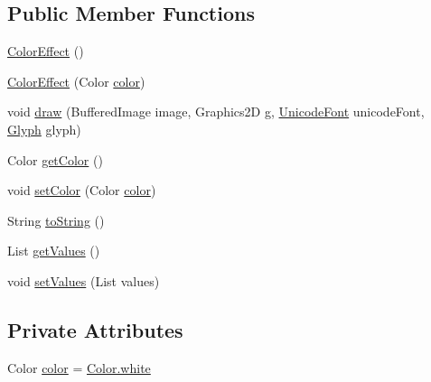 \subsection*{Public Member Functions}
\begin{DoxyCompactItemize}
\item 
\mbox{\hyperlink{classorg_1_1newdawn_1_1slick_1_1font_1_1effects_1_1_color_effect_aca7ac7b27182506a5877a5676a4bb404}{Color\+Effect}} ()
\item 
\mbox{\hyperlink{classorg_1_1newdawn_1_1slick_1_1font_1_1effects_1_1_color_effect_a85b6c7c78ee022dc42d6f82c4be32fe2}{Color\+Effect}} (Color \mbox{\hyperlink{classorg_1_1newdawn_1_1slick_1_1font_1_1effects_1_1_color_effect_a2eb4f77d200293ea86166edce12f9817}{color}})
\item 
void \mbox{\hyperlink{classorg_1_1newdawn_1_1slick_1_1font_1_1effects_1_1_color_effect_a79fa23028d343b2779d582aa0f03a0fe}{draw}} (Buffered\+Image image, Graphics2D g, \mbox{\hyperlink{classorg_1_1newdawn_1_1slick_1_1_unicode_font}{Unicode\+Font}} unicode\+Font, \mbox{\hyperlink{classorg_1_1newdawn_1_1slick_1_1font_1_1_glyph}{Glyph}} glyph)
\item 
Color \mbox{\hyperlink{classorg_1_1newdawn_1_1slick_1_1font_1_1effects_1_1_color_effect_a2fff83c42b7a56f45731353057cd18fa}{get\+Color}} ()
\item 
void \mbox{\hyperlink{classorg_1_1newdawn_1_1slick_1_1font_1_1effects_1_1_color_effect_a2ffbac9b174a71718bf7fe933dd1fd52}{set\+Color}} (Color \mbox{\hyperlink{classorg_1_1newdawn_1_1slick_1_1font_1_1effects_1_1_color_effect_a2eb4f77d200293ea86166edce12f9817}{color}})
\item 
String \mbox{\hyperlink{classorg_1_1newdawn_1_1slick_1_1font_1_1effects_1_1_color_effect_ad407a023e57bda66a9c20fdc66dd3224}{to\+String}} ()
\item 
List \mbox{\hyperlink{classorg_1_1newdawn_1_1slick_1_1font_1_1effects_1_1_color_effect_a295d74daac884b7e5dda1bbbd1263547}{get\+Values}} ()
\item 
void \mbox{\hyperlink{classorg_1_1newdawn_1_1slick_1_1font_1_1effects_1_1_color_effect_afe9ec9185b274fed7059b6d74791d089}{set\+Values}} (List values)
\end{DoxyCompactItemize}
\subsection*{Private Attributes}
\begin{DoxyCompactItemize}
\item 
Color \mbox{\hyperlink{classorg_1_1newdawn_1_1slick_1_1font_1_1effects_1_1_color_effect_a2eb4f77d200293ea86166edce12f9817}{color}} = \mbox{\hyperlink{classorg_1_1newdawn_1_1slick_1_1_color_afcd91cbdd26233d226d734f70dca3d2e}{Color.\+white}}
\end{DoxyCompactItemize}


